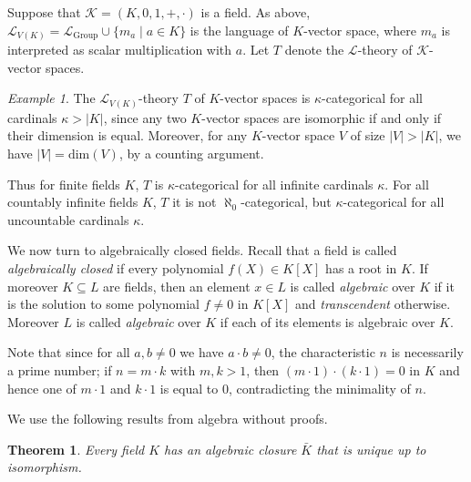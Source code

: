 \documentclass[a4paper, 11pt]{amsart}
\newtheorem{theorem}{Theorem}[subsection]
\theoremstyle{remark}
\newtheorem{example}[example]{Example}
\newcommand{\KK}{\mathbb{K}}
\newcommand{\cL}{\mathcal L}
\newcommand{\cK}{\mathcal K}
\begin{document}
Suppose that $\cK=(K,0,1,+,\cdot)$ is a field. 
As above, $\cL_{V(K)}=\cL_{\mathrm{Group}}\cup\{m_a\mid a\in K\}$ is the language of $K$-vector space, where $m_a$ is interpreted as scalar multiplication with $a$. 
Let $T$ denote the $\cL$-theory of $\cK$-vector spaces. 

\begin{example} 
The $\cL_{V(K)}$-theory $T$ of $K$-vector spaces is $\kappa$-categorical for all cardinals $\kappa>|K|$, since any two $K$-vector spaces are isomorphic if and only if their dimension is equal. 
Moreover, for any $K$-vector space $V$ of size $|V|>|K|$, we have $|V|=\mathrm{dim}(V)$, by a counting argument. 

Thus for finite fields $K$, $T$ is $\kappa$-categorical for all infinite cardinals $\kappa$. 
For all countably infinite fields $K$, $T$ it is not $\aleph_0$-categorical, but $\kappa$-categorical for all uncountable cardinals $\kappa$. 
\end{example} 



We now turn to algebraically closed fields. Recall that a field is called \emph{algebraically closed} if every polynomial $f(X)\in K[X]$ has a root in $K$. If moreover $K\subseteq L$ are fields, then an element $x\in L$ is called \emph{algebraic} over $K$ if it is the solution  to some polynomial $f\neq 0$ in $K[X]$ and \emph{transcendent} otherwise. Moreover $L$ is called \emph{algebraic} over $K$ if each of its elements is algebraic over $K$. 

Note that since for all $a,b\neq 0$ we have $a\cdot b\neq 0$,  the characteristic $n$ is necessarily a prime number; if $n=m\cdot k$ with $m,k>1$, then $(m\cdot 1)\cdot (k\cdot 1)=0$ in $K$ and hence one of $m\cdot 1$ and $k\cdot 1$ is equal to $0$, contradicting the minimality of $n$. 


We use the following results from algebra without proofs. 

\begin{theorem} 
Every field $K$ has an algebraic closure $\bar{K}$ that is unique up to isomorphism. 
\end{theorem} 
\end{document}
